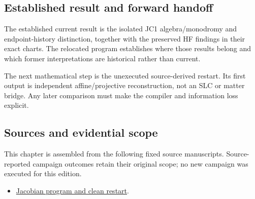 \subsection{Established result and forward
handoff}\label{viii-ch11-established-result-and-forward-handoff}

The established current result is the isolated JC1 algebra/monodromy and
endpoint-history distinction, together with the preserved HF findings in
their exact charts. The relocated program establishes where those
results belong and which former interpretations are historical rather
than current.

The next mathematical step is the unexecuted source-derived restart. Its
first output is independent affine/projective reconstruction, not an SLC
or matter bridge. Any later comparison must make the compiler and
information loss explicit.

\subsection{Sources and evidential
scope}\label{viii-ch11-sources-and-evidential-scope}

This chapter is assembled from the following fixed source manuscripts.
Source-reported campaign outcomes retain their original scope; no new
campaign was executed for this edition.

\begin{itemize}
\tightlist
\item
  \href{https://github.com/iwtbotiwtwot/SAMA/blob/4c2b5dc1649da5900c90b90d0ce56c223dbb7717/vol_iii/05-primes-and-jacobians/jacobian-program-and-clean-restart.md}{Jacobian
  program and clean restart}.
\end{itemize}
